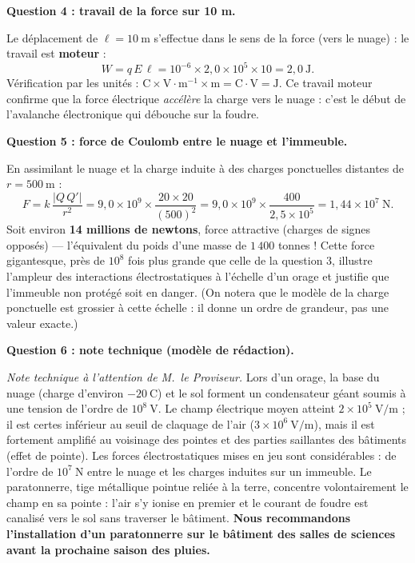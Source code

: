 \documentclass[11pt]{article}
\begin{document}
\begin{exoresolu}
\textbf{Question 4 : travail de la force sur 10 m.}

Le déplacement de $\ell = 10~\text{m}$ s'effectue dans le sens de la force (vers le nuage) : le travail est \textbf{moteur} :
\[
W = q\,E\,\ell = 10^{-6}\times 2{,}0\times 10^{5}\times 10 = 2{,}0~\text{J}.
\]
Vérification par les unités : $\text{C}\times\text{V}\cdot\text{m}^{-1}\times\text{m} = \text{C}\cdot\text{V} = \text{J}$. Ce travail moteur confirme que la force électrique \emph{accélère} la charge vers le nuage : c'est le début de l'avalanche électronique qui débouche sur la foudre.

\textbf{Question 5 : force de Coulomb entre le nuage et l'immeuble.}

En assimilant le nuage et la charge induite à des charges ponctuelles distantes de $r = 500~\text{m}$ :
\[
F = k\,\frac{|Q\,Q'|}{r^{2}} = 9{,}0\times 10^{9}\times\frac{20\times 20}{(500)^{2}}
= 9{,}0\times 10^{9}\times\frac{400}{2{,}5\times 10^{5}}
= 1{,}44\times 10^{7}~\text{N}.
\]
Soit environ \textbf{14 millions de newtons}, force attractive (charges de signes opposés) — l'équivalent du poids d'une masse de $1\,400$ tonnes ! Cette force gigantesque, près de $10^{8}$ fois plus grande que celle de la question 3, illustre l'ampleur des interactions électrostatiques à l'échelle d'un orage et justifie que l'immeuble non protégé soit en danger. (On notera que le modèle de la charge ponctuelle est grossier à cette échelle : il donne un ordre de grandeur, pas une valeur exacte.)

\textbf{Question 6 : note technique (modèle de rédaction).}

\emph{Note technique à l'attention de M.\ le Proviseur.} Lors d'un orage, la base du nuage (charge d'environ $-20~\text{C}$) et le sol forment un condensateur géant soumis à une tension de l'ordre de $10^{8}~\text{V}$. Le champ électrique moyen atteint $2\times 10^{5}~\text{V/m}$ ; il est certes inférieur au seuil de claquage de l'air ($3\times 10^{6}~\text{V/m}$), mais il est fortement amplifié au voisinage des pointes et des parties saillantes des bâtiments (effet de pointe). Les forces électrostatiques mises en jeu sont considérables : de l'ordre de $10^{7}~\text{N}$ entre le nuage et les charges induites sur un immeuble. Le paratonnerre, tige métallique pointue reliée à la terre, concentre volontairement le champ en sa pointe : l'air s'y ionise en premier et le courant de foudre est canalisé vers le sol sans traverser le bâtiment. \textbf{Nous recommandons l'installation d'un paratonnerre sur le bâtiment des salles de sciences avant la prochaine saison des pluies.}
\end{exoresolu}
\end{document}
